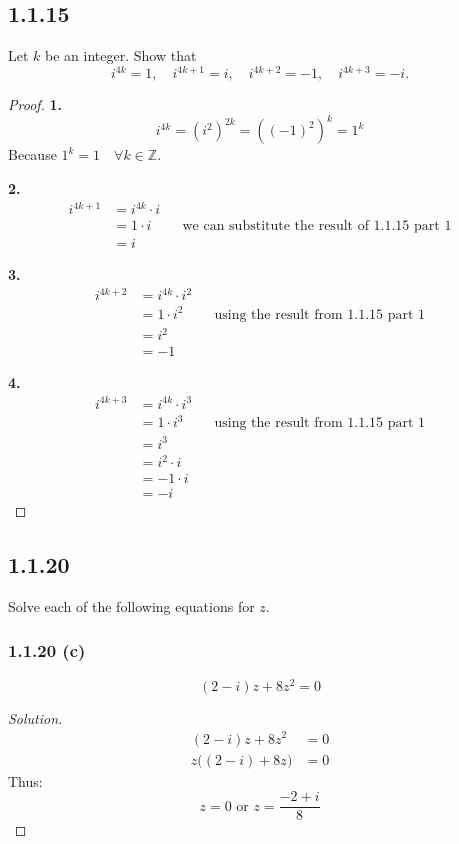 \documentclass{article}
\newenvironment{solution}{
\begin{proof}[Solution]}{
\end{proof}}
\begin{document}
\subsection*{1.1.15}
Let $k$ be an integer. Show that
\[
  i^{4k} = 1, \quad i^{4k+1} = i, \quad i^{4k+2} = -1, \quad i^{4k+3} = -i.
\]
\begin{proof}
  \textbf{1.}
  \[
    i^{4k} = (i^2)^{2k} = ((-1)^2)^k = 1^k
  \]
  Because $1^k = 1 \quad \forall k \in \mathbb{Z}$.

  \textbf{2.}
  \begin{align*}
    i^{4k+1} &= i^{4k} \cdot i \\
      &= 1 \cdot i && \text{we can substitute the result of 1.1.15 part 1} \\
      &= i
  \end{align*}

  \textbf{3.}
  \begin{align*}
    i^{4k+2} &= i^{4k} \cdot i^2 \\
      &= 1 \cdot i^2 && \text{using the result from 1.1.15 part 1} \\
      &= i^2 \\
      &= -1
  \end{align*}

  \textbf{4.}
  \begin{align*}
    i^{4k+3} &= i^{4k} \cdot i^3 \\
      &= 1 \cdot i^3 && \text{using the result from 1.1.15 part 1} \\
      &= i^3 \\
      &= i^2 \cdot i \\
      &= -1 \cdot i \\
      &= -i
  \end{align*}
\end{proof}

\subsection*{1.1.20}
Solve each of the following equations for $z$.

\subsubsection*{1.1.20 (c)}
\[
  (2-i)z + 8z^2 = 0
\]
\begin{solution}
  \begin{align*}
    (2-i)z + 8z^2 &= 0 \\
    z\bigl((2-i) + 8z\bigr) &= 0
  \end{align*}
  Thus:
  \[
    z = 0 \text{ or } z = \frac{-2+i}{8}
  \]
\end{solution}
\end{document}
